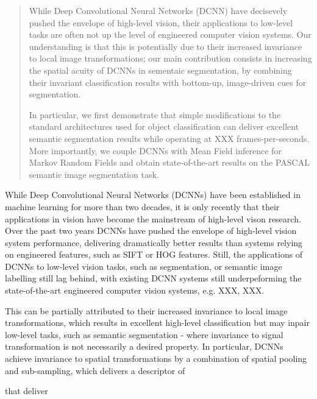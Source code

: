 \newcommand{\mycomment}[1]{}
\begin{abstract}
While Deep Convolutional Neural Networks (DCNN) have decisevely pushed the envelope of  high-level vision, their applications to low-level tasks are often not up the level of engineered computer vision systems. Our understanding is that this is  potentially due to their increased invariance to local image transformations;  our main contribution consists in  increasing the spatial acuity of DCNNs in  sementaic segmentation, by combining their invariant classification results with bottom-up, image-driven cues for segmentation. 

In particular, we first demonstrate that simple modifications to the standard architectures used for object classification can deliver excellent semantic segmentation results while operating at XXX frames-per-seconds. More importantly, we couple DCNNs  with Mean Field inference for Markov Random Fields  and obtain state-of-the-art results on the PASCAL semantic image segmentation task.  

\mycomment{We consider our main contribution to be the increase of the acuity of DCNNs, by combining invariant classifications with bottom-up, image-driven cues for segmentation.} 

\end{abstract}


While Deep Convolutional Neural Networks (DCNNs) have been established in machine learning for more than two decades, it is only recently that their applications in  vision have become the mainstream of high-level vison research.
Over the past two years  DCNNs have 
 pushed the envelope of high-level vision system performance, delivering  dramatically better results than systems relying on engineered features, such as SIFT or HOG features.
Still, the applications of DCNNs to low-level vision tasks, such as segmentation, or semantic image labelling still lag behind, with existing DCNN systems still underpeforming the state-of-the-art engineered computer vision systems, e.g. XXX, XXX.

 This can be partially attributed to their increased invariance to local image transformations, which results in excellent high-level classification but may inpair low-level tasks, such as semantic segmentation - where invariance to signal transformation is not necessarily a desired property. In particular, DCNNs achieve invariance to spatial transformations by a combination of spatial pooling and sub-sampling, which delivers a descriptor of 

that deliver 
